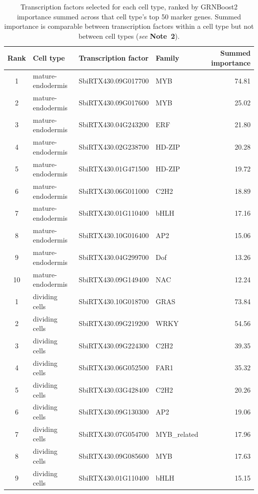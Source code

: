 \documentclass[11pt,a4paper]{article}
\newcommand{\seenote}[1]{(\textit{see} \textbf{Note~#1})}
\begin{document}
\begin{table}[htbp]
\centering
\begin{singlespace}
\caption{Transcription factors selected for each cell type, ranked by GRNBoost2 importance summed across that cell type's top 50 marker genes. Summed importance is comparable between transcription factors within a cell type but not between cell types \seenote{2}.}
\label{tab:tfs}
\small
\begin{tabular}{clll r}
\toprule
Rank & Cell type & Transcription factor & Family & Summed importance \\
\midrule
1  & mature-endodermis & SbiRTX430.09G017700 & MYB    & 74.81 \\
2  & mature-endodermis & SbiRTX430.09G017600 & MYB    & 25.02 \\
3  & mature-endodermis & SbiRTX430.04G243200 & ERF    & 21.80 \\
4  & mature-endodermis & SbiRTX430.02G238700 & HD-ZIP & 20.28 \\
5  & mature-endodermis & SbiRTX430.01G471500 & HD-ZIP & 19.72 \\
6  & mature-endodermis & SbiRTX430.06G011000 & C2H2   & 18.89 \\
7  & mature-endodermis & SbiRTX430.01G110400 & bHLH   & 17.16 \\
8  & mature-endodermis & SbiRTX430.10G016400 & AP2    & 15.06 \\
9  & mature-endodermis & SbiRTX430.04G299700 & Dof    & 13.26 \\
10 & mature-endodermis & SbiRTX430.09G149400 & NAC    & 12.24 \\
\midrule
1  & dividing cells & SbiRTX430.10G018700 & GRAS        & 73.84 \\
2  & dividing cells & SbiRTX430.09G219200 & WRKY        & 54.56 \\
3  & dividing cells & SbiRTX430.09G224300 & C2H2        & 39.35 \\
4  & dividing cells & SbiRTX430.06G052500 & FAR1        & 35.32 \\
5  & dividing cells & SbiRTX430.03G428400 & C2H2        & 20.26 \\
6  & dividing cells & SbiRTX430.09G130300 & AP2         & 19.06 \\
7  & dividing cells & SbiRTX430.07G054700 & MYB\_related & 17.96 \\
8  & dividing cells & SbiRTX430.09G085600 & MYB         & 17.63 \\
9  & dividing cells & SbiRTX430.01G110400 & bHLH        & 15.15 \\

\end{tabular}
\end{singlespace}
\end{table}
\end{document}
